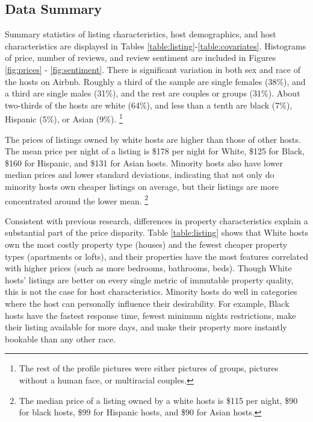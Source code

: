 \subsection{Data Summary}
\label{summary}

Summary statistics of listing characteristics, host demographics, and host characteristics are displayed in Tables \ref{table:listing}-\ref{table:covariates}. Histograms of price, number of reviews, and review sentiment are included in Figures \ref{fig:prices} - \ref{fig:sentiment}. There is significant variation in both sex and race of the hosts on Airbnb. Roughly a third of the sample are single females (38\%), and a third are single males (31\%), and the rest are couples or groups (31\%). About two-thirds of the hosts are white (64\%), and less than a tenth are black (7\%), Hispanic (5\%), or Asian (9\%).%
	\footnote{The rest of the profile pictures were either pictures of groups, pictures without a human face, or multiracial couples.} 

The prices of listings owned by white hosts are higher than those of other hosts. The mean price per night of a listing is \$178 per night for White, \$125 for Black, \$160 for Hispanic, and \$131 for Asian hosts. Minority hosts also have lower median prices and lower standard deviations, indicating that not only do minority hosts own cheaper listings on average, but their listings are more concentrated around the lower mean.%
	\footnote{The median price of a listing owned by a white hosts is \$115 per night, \$90 for black hosts, \$99 for Hispanic hosts, and \$90 for Asian hosts.} 

Consistent with previous research, differences in property characteristics explain a substantial part of the price disparity. Table \ref{table:listing} shows that White hosts own the most costly property type (houses) and the fewest cheaper property types (apartments or lofts), and their properties have the most features correlated with higher prices (such as more bedrooms, bathrooms, beds). Though White hosts' listings are better on every single metric of immutable property quality, this is not the case for host characteristics. Minority hosts do well in categories where the host can personally influence their desirability. For example, Black hosts have the fastest response time, fewest minimum nights restrictions, make their listing available for more days, and make their property more instantly bookable than any other race.  


